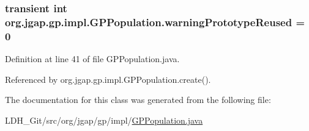 \hypertarget{classorg_1_1jgap_1_1gp_1_1impl_1_1_g_p_population_aeb4067371d53afb6f4e0a4939725dd36}{
\subsubsection[{warning\-Prototype\-Reused}]{\setlength{\rightskip}{0pt plus 5cm}transient int org.\-jgap.\-gp.\-impl.\-G\-P\-Population.\-warning\-Prototype\-Reused = 0\hspace{0.3cm}{\ttfamily [private]}}}\label{classorg_1_1jgap_1_1gp_1_1impl_1_1_g_p_population_aeb4067371d53afb6f4e0a4939725dd36}


Definition at line 41 of file G\-P\-Population.\-java.



Referenced by org.\-jgap.\-gp.\-impl.\-G\-P\-Population.\-create().



The documentation for this class was generated from the following file\-:\begin{DoxyCompactItemize}
\item 
L\-D\-H\-\_\-\-Git/src/org/jgap/gp/impl/\hyperlink{_g_p_population_8java}{G\-P\-Population.\-java}\end{DoxyCompactItemize}
